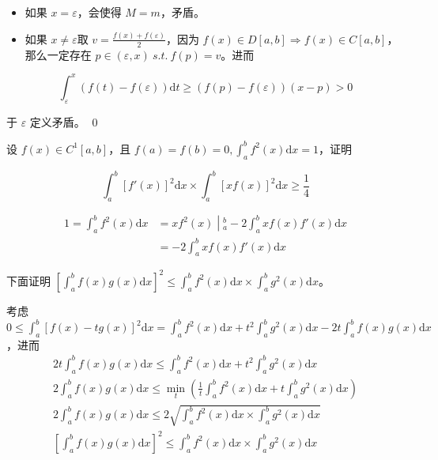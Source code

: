 \begin{itemize}
	\item 如果 $\displaystyle x=\varepsilon $，会使得 $\displaystyle M=m$，矛盾。
	\item 如果 $\displaystyle x\neq \varepsilon $取 $\displaystyle v=\frac{f( x) +f( \varepsilon )}{2}$，因为 $\displaystyle f( x) \in D[ a,b] \Rightarrow f( x) \in C[ a,b]$，那么一定存在 $\displaystyle p\in ( \varepsilon ,x) \ s.t.\ f( p) =v$。进而 
\end{itemize}
\begin{equation*}
	\int _{\varepsilon }^{x}( f( t) -f( \varepsilon ))\mathrm{d} t\geqslant ( f( p) -f( \varepsilon ))( x-p)  >0
\end{equation*}

于 $\displaystyle \varepsilon $ 定义矛盾。
\qed 



\begin{ques}
	设 $\displaystyle f( x) \in C^{1}[ a,b]$，且 $\displaystyle f( a) =f( b) =0,\int _{a}^{b} f^{2}( x)\mathrm{d} x=1$，证明


\begin{equation*}
	\int _{a}^{b}[ f'( x)]^{2}\mathrm{d} x\times \int _{a}^{b}[ xf( x)]^{2}\mathrm{d} x\geqslant \frac{1}{4}
\end{equation*}

\end{ques}
\begin{equation*}
	\begin{aligned}
		1=\int _{a}^{b} f^{2}( x)\mathrm{d} x & =\left. xf^{2}( x)\middle| _{a}^{b}\right. -2\int _{a}^{b} xf( x) f'( x)\mathrm{d} x\\
		& =-2\int _{a}^{b} xf( x) f'( x)\mathrm{d} x
	\end{aligned}
\end{equation*}


下面证明 $\displaystyle \left[\int _{a}^{b} f( x) g( x)\mathrm{d} x\right]^{2} \leqslant \int _{a}^{b} f^{2}( x)\mathrm{d} x\times \int _{a}^{b} g^{2}( x)\mathrm{d} x$。



考虑 $\displaystyle 0\leqslant \int _{a}^{b}[ f( x) -tg( x)]^{2}\mathrm{d} x=\int _{a}^{b} f^{2}( x)\mathrm{d} x+t^{2}\int _{a}^{b} g^{2}( x)\mathrm{d} x-2t\int _{a}^{b} f( x) g( x)\mathrm{d} x$，进而
\begin{gather*}
	2t\int _{a}^{b} f( x) g( x)\mathrm{d} x\leqslant \int _{a}^{b} f^{2}( x)\mathrm{d} x+t^{2}\int _{a}^{b} g^{2}( x)\mathrm{d} x\\
	2\int _{a}^{b} f( x) g( x)\mathrm{d} x\leqslant \min_{t}\left(\frac{1}{t}\int _{a}^{b} f^{2}( x)\mathrm{d} x+t\int _{a}^{b} g^{2}( x)\mathrm{d} x\right)\\
	2\int _{a}^{b} f( x) g( x)\mathrm{d} x\leqslant 2\sqrt{\int _{a}^{b} f^{2}( x)\mathrm{d} x\times \int _{a}^{b} g^{2}( x)\mathrm{d} x}\\
	\left[\int _{a}^{b} f( x) g( x)\mathrm{d} x\right]^{2} \leqslant \int _{a}^{b} f^{2}( x)\mathrm{d} x\times \int _{a}^{b} g^{2}( x)\mathrm{d} x
\end{gather*}

